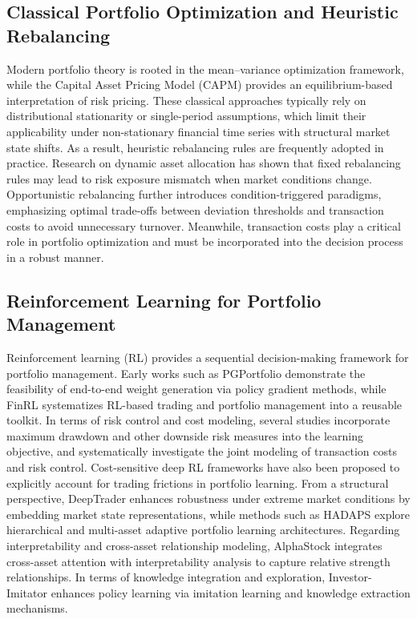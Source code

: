 \documentclass[letterpaper]{article} %
\begin{document}
\subsection{Classical Portfolio Optimization and Heuristic Rebalancing}
Modern portfolio theory is rooted in the mean--variance optimization framework\citep{MVO}, while the Capital Asset Pricing Model (CAPM) provides an equilibrium-based interpretation of risk pricing\citep{CAMP}. These classical approaches typically rely on distributional stationarity or single-period assumptions, which limit their applicability under non-stationary financial time series with structural market state shifts. As a result, heuristic rebalancing rules are frequently adopted in practice.
Research on dynamic asset allocation has shown that fixed rebalancing rules may lead to risk exposure mismatch when market conditions change\citep{Perold1988DynamicSF}. Opportunistic rebalancing further introduces condition-triggered paradigms, emphasizing optimal trade-offs between deviation thresholds and transaction costs to avoid unnecessary turnover\citep{9}. Meanwhile, transaction costs play a critical role in portfolio optimization and must be incorporated into the decision process in a robust manner\citep{10}.

\subsection{Reinforcement Learning for Portfolio Management}
Reinforcement learning (RL) provides a sequential decision-making framework for portfolio management. Early works such as PGPortfolio demonstrate the feasibility of end-to-end weight generation via policy gradient methods\citep{4}, while FinRL systematizes RL-based trading and portfolio management into a reusable toolkit\citep{5}.
In terms of risk control and cost modeling, several studies incorporate maximum drawdown and other downside risk measures into the learning objective\citep{11}, and systematically investigate the joint modeling of transaction costs and risk control\citep{23}. Cost-sensitive deep RL frameworks have also been proposed to explicitly account for trading frictions in portfolio learning\citep{24}.
From a structural perspective, DeepTrader enhances robustness under extreme market conditions by embedding market state representations\citep{6}, while methods such as HADAPS explore hierarchical and multi-asset adaptive portfolio learning architectures\citep{25}. Regarding interpretability and cross-asset relationship modeling, AlphaStock integrates cross-asset attention with interpretability analysis to capture relative strength relationships\citep{alphastock}. In terms of knowledge integration and exploration, Investor-Imitator enhances policy learning via imitation learning and knowledge extraction mechanisms\citep{8}.
\end{document}
